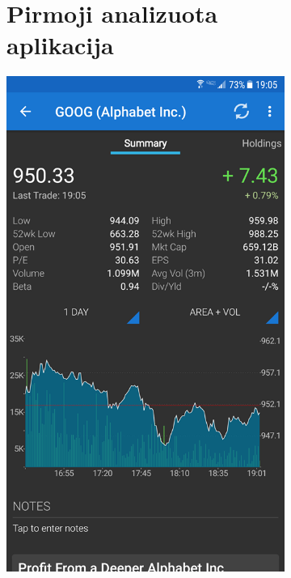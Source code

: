 \documentclass[a4paper,12pt,fleqn]{article}
\begin{document}
\begin{appendices}
\begin{figure}[h!]
\begin{subfigure}{0.5\textwidth}
		\section{Pirmoji analizuota aplikacija}
		\includegraphics[scale=0.4]{priedas2.png}
		\label{app:priedas2}
	\end{subfigure}
\end{figure}
\begin{figure}[h!]
	\centering
	\begin{subfigure}{0.5\textwidth}
		\centering

\end{subfigure}
\end{figure}
\end{appendices}
\end{document}
